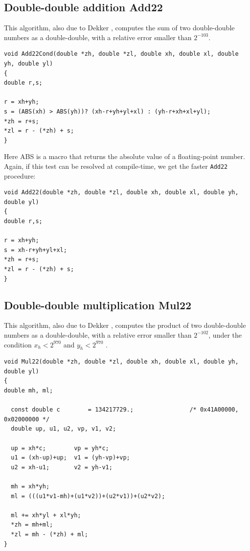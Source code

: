 \subsection{Double-double addition {Add22}}
  
This algorithm, also due to Dekker \cite{Dek71}, computes the sum of
two double-double numbers as a double-double, with a relative error
smaller than $2^{-103}$.

\begin{lstlisting}[label={Add22Cond},caption={Add22Cond},firstnumber=1]
void Add22Cond(double *zh, double *zl, double xh, double xl, double yh, double yl)
{
double r,s;

r = xh+yh;
s = (ABS(xh) > ABS(yh))? (xh-r+yh+yl+xl) : (yh-r+xh+xl+yl);
*zh = r+s;
*zl = r - (*zh) + s;
}
\end{lstlisting}

Here ABS is a macro that returns the absolute value of a
floating-point number. Again, if this test can be resolved at
compile-time, we get the faster \texttt{Add22} procedure:

\begin{lstlisting}[label={Add22},caption={Add22},firstnumber=1]
void Add22(double *zh, double *zl, double xh, double xl, double yh, double yl)
{
double r,s;

r = xh+yh;
s = xh-r+yh+yl+xl;
*zh = r+s;
*zl = r - (*zh) + s;
}
\end{lstlisting}




\subsection{Double-double multiplication {Mul22}}
  
This algorithm, also due to Dekker \cite{Dek71}, computes the product of
two double-double numbers as a double-double, with a relative error
smaller than $2^{-102}$, under the condition $x_h<2^{970}$ and $y_h<2^{970}$ . 

\begin{lstlisting}[label={Mul22},caption={Mul22},firstnumber=1]
void Mul22(double *zh, double *zl, double xh, double xl, double yh, double yl)
{
double mh, ml;

  const double c        = 134217729.;                /* 0x41A00000, 0x02000000 */ 
  double up, u1, u2, vp, v1, v2;

  up = xh*c;        vp = yh*c;
  u1 = (xh-up)+up;  v1 = (yh-vp)+vp;
  u2 = xh-u1;       v2 = yh-v1;
  
  mh = xh*yh;
  ml = (((u1*v1-mh)+(u1*v2))+(u2*v1))+(u2*v2);

  ml += xh*yl + xl*yh;
  *zh = mh+ml;
  *zl = mh - (*zh) + ml;
}  
\end{lstlisting}

